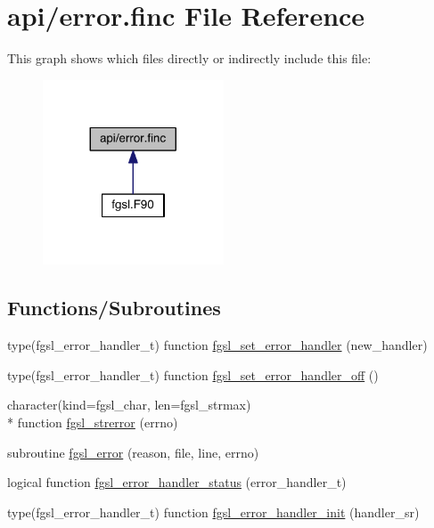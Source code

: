 \hypertarget{error_8finc}{\section{api/error.finc File Reference}
\label{error_8finc}
}
This graph shows which files directly or indirectly include this file\-:
\nopagebreak
\begin{figure}[H]
\begin{center}
\leavevmode
\includegraphics[width=152pt]{error_8finc__dep__incl}
\end{center}
\end{figure}
\subsection*{Functions/\-Subroutines}
\begin{DoxyCompactItemize}
\item 
type(fgsl\-\_\-error\-\_\-handler\-\_\-t) function \hyperlink{error_8finc_a0bcea44cb57ec40ff8ee5deb56628d6c}{fgsl\-\_\-set\-\_\-error\-\_\-handler} (new\-\_\-handler)
\item 
type(fgsl\-\_\-error\-\_\-handler\-\_\-t) function \hyperlink{error_8finc_a038022a5ae74d2221231fb2d484e3fb9}{fgsl\-\_\-set\-\_\-error\-\_\-handler\-\_\-off} ()
\item 
character(kind=fgsl\-\_\-char, len=fgsl\-\_\-strmax) \\*
function \hyperlink{error_8finc_afb379d7136f115fcbc5fbe6178ab1a8b}{fgsl\-\_\-strerror} (errno)
\item 
subroutine \hyperlink{error_8finc_a4d5b557021a59a337ae0a724da2f2f79}{fgsl\-\_\-error} (reason, file, line, errno)
\item 
logical function \hyperlink{error_8finc_aa355a6ea584a0315b6bd48125143f61e}{fgsl\-\_\-error\-\_\-handler\-\_\-status} (error\-\_\-handler\-\_\-t)
\item 
type(fgsl\-\_\-error\-\_\-handler\-\_\-t) function \hyperlink{error_8finc_a2021475812bde99b19e3497120fe502f}{fgsl\-\_\-error\-\_\-handler\-\_\-init} (handler\-\_\-sr)
\end{DoxyCompactItemize}


